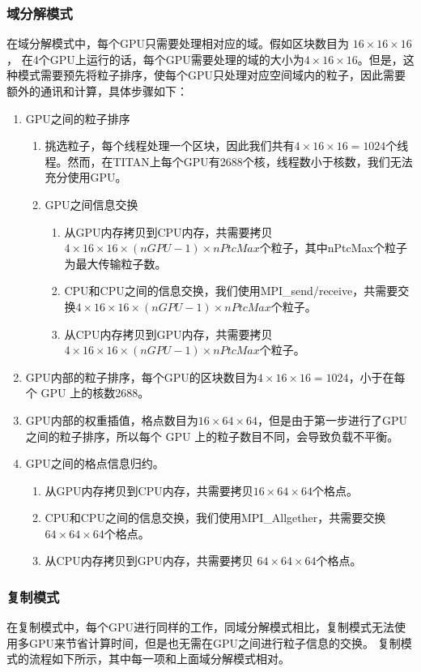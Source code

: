 \subsubsection{域分解模式}
在域分解模式中，每个GPU只需要处理相对应的域。假如区块数目为 $16 \times 16 \times 16$， 在4个GPU上运行的话，每个GPU需要处理的域的大小为$4 \times 16 \times 16$。但是，这种模式需要预先将粒子排序，使每个GPU只处理对应空间域内的粒子，因此需要额外的通讯和计算，具体步骤如下：
\begin{enumerate}
  \item GPU之间的粒子排序
  \begin{enumerate}
    \item 挑选粒子，每个线程处理一个区块，因此我们共有$4 \times 16 \times 16 = 1024$个线程。然而，在TITAN上每个GPU有2688个核，线程数小于核数，我们无法充分使用GPU。
    \item GPU之间信息交换
    \begin{enumerate}
      \item 从GPU内存拷贝到CPU内存，共需要拷贝$4 \times 16 \times 16\times(nGPU-1) \times nPtcMax$个粒子，其中nPtcMax个粒子为最大传输粒子数。
      \item CPU和CPU之间的信息交换，我们使用MPI\_send/receive，共需要交换$4 \times 16 \times 16 \times (nGPU-1) \times nPtcMax$个粒子。
      \item 从CPU内存拷贝到GPU内存，共需要拷贝$4 \times 16 \times 16 \times (nGPU-1) \times nPtcMax$个粒子。
    \end{enumerate}
  \end{enumerate}
  \item GPU内部的粒子排序，每个GPU的区块数目为$4 \times 16 \times 16=1024$，小于在每个 GPU 上的核数2688。
  \item GPU内部的权重插值，格点数目为$16 \times 64 \times 64$，但是由于第一步进行了GPU之间的粒子排序，所以每个 GPU 上的粒子数目不同，会导致负载不平衡。
  \item GPU之间的格点信息归约。
  \begin{enumerate}
    \item 从GPU内存拷贝到CPU内存，共需要拷贝$16 \times 64 \times 64$个格点。
    \item CPU和CPU之间的信息交换，我们使用MPI\_Allgether，共需要交换$64 \times 64 \times 64$个格点。
    \item 从CPU内存拷贝到GPU内存，共需要拷贝 $64 \times 64 \times 64$个格点。
  \end{enumerate}
\end{enumerate}

\subsubsection{复制模式}
在复制模式中，每个GPU进行同样的工作，同域分解模式相比，复制模式无法使用多GPU来节省计算时间，但是也无需在GPU之间进行粒子信息的交换。
复制模式的流程如下所示，其中每一项和上面域分解模式相对。

